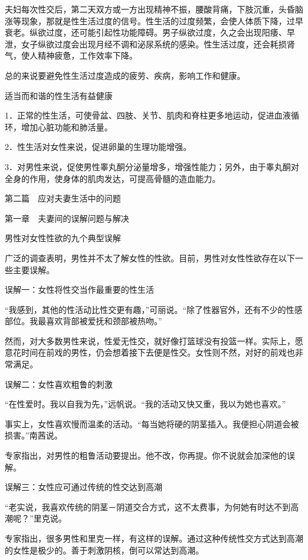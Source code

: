 \documentclass[12pt,UTF8]{ctexbook}
\begin{document}
夫妇每次性交后，第二天双方或一方出现精神不振，腰酸背痛，下肢沉重，头昏脑涨等现象，那就是性生活过度的信号。性生活的过度频繁，会使人体质下降，过早衰老。纵欲过度，还可能引起性功能障碍。男子纵欲过度，久之会出现阳痿、早泄，女子纵欲过度会出现月经不调和泌尿系统的感染。性生活过度，还会耗损肾气，使人精神疲惫，工作效率下降。

总的来说要避免性生活过度造成的疲劳、疾病，影响工作和健康。





适当而和谐的性生活有益健康


1．正常的性生活，可使骨盆、四肢、关节、肌肉和脊柱更多地运动，促进血液循环，增加心脏功能和肺活量。

2．性生活对女性来说，促进卵巢的生理功能增强。

3．对男性来说，促使男性睾丸酮分泌量增多，增强性能力；另外，由于睾丸酮对全身的作用，使身体的肌肉发达，可提高骨髓的造血能力。





第二篇　应对夫妻生活中的问题





第一章　夫妻间的误解问题与解决


男性对女性性欲的九个典型误解


广泛的调查表明，男性并不太了解女性的性欲。目前，男性对女性性欲存在以下一些主要误解。

误解一：女性将性交当作最重要的性生活

“我感到，其他的性活动比性交更有趣，”可丽说。“除了性器官外，还有不少的性感部位。我最喜欢背部被爱抚和颈部被热吻。”

然而，对大多数男性来说，性爱无性交，就好像打篮球没有投篮一样。实际上，愿意花时间在前戏的男性，仍会想着接下去便是性交。女性则不然，对好的前戏也非常满足。

误解二：女性喜欢粗鲁的刺激

“在性爱时。我以自我为先，”远帆说。“我的活动又快又重，我以为她也喜欢。”

事实上，女性喜欢慢而温柔的活动。“每当她将硬的阴茎插入。我便担心阴道会被损害。”南茜说。

专家指出，对男性的粗鲁活动要提出。他不改，你再提。你不说就会加深他的误解。

误解三：女性应可通过传统的性交达到高潮

“老实说，我喜欢传统的阴茎－阴道交合方式，这不太费事，为何她有时达不到高潮呢？”里克说。

专家指出，很多男性和里克一样，有这样的误解。通过这种传统性交方式达到高潮的女性是极少的。善于刺激阴核，倒可以常达到高潮。
\end{document}
